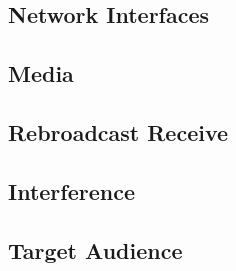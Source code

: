\subsection{Network Interfaces}
\label{loc:ExtIF_Network}



\KNEADSUBSECTIONNEWPAGE
\subsection{Media}
\label{loc:ExtIF_Media}




\KNEADSUBSECTIONNEWPAGE
\subsection{Rebroadcast Receive}
\label{loc:ExtIF_Rebroadcast}




\KNEADSUBSECTIONNEWPAGE
\subsection{Interference}
\label{loc:ExtIF_Interference}




\KNEADSUBSECTIONNEWPAGE
\subsection{Target Audience}
\label{loc:ExtIF_Audience}




